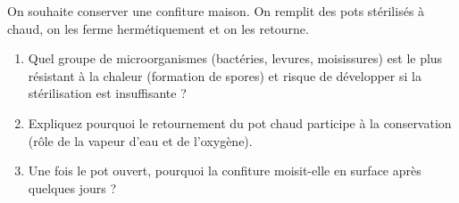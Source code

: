 \documentclass[11pt]{article}
\begin{document}
\begin{exercice}
On souhaite conserver une confiture maison. On remplit des pots stérilisés à chaud, on les ferme hermétiquement et on les retourne.
\begin{enumerate}
    \item Quel groupe de microorganismes (bactéries, levures, moisissures) est le plus résistant à la chaleur (formation de spores) et risque de développer si la stérilisation est insuffisante ?
    \item Expliquez pourquoi le retournement du pot chaud participe à la conservation (rôle de la vapeur d'eau et de l'oxygène).
    \item Une fois le pot ouvert, pourquoi la confiture moisit-elle en surface après quelques jours ?
\end{enumerate}
\end{exercice}
\end{document}
